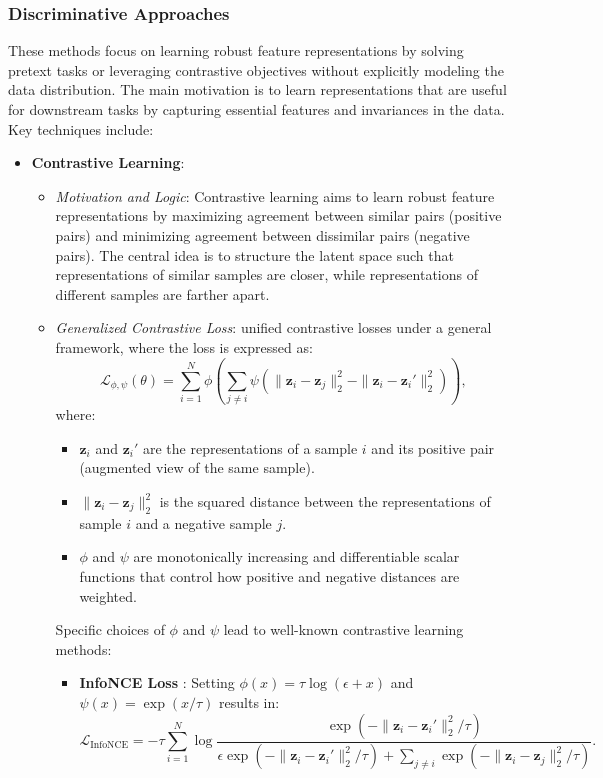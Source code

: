 \subsubsection{Discriminative Approaches}

These methods focus on learning robust feature representations by solving pretext tasks or leveraging contrastive objectives without explicitly modeling the data distribution. The main motivation is to learn representations that are useful for downstream tasks by capturing essential features and invariances in the data. Key techniques include:

\begin{itemize}
    \item \textbf{Contrastive Learning}:
    \begin{itemize}
        \item \emph{Motivation and Logic}: Contrastive learning aims to learn robust feature representations by maximizing agreement between similar pairs (positive pairs) and minimizing agreement between dissimilar pairs (negative pairs). The central idea is to structure the latent space such that representations of similar samples are closer, while representations of different samples are farther apart.

        \item \emph{Generalized Contrastive Loss}: \cite{tian2022} unified contrastive losses under a general framework, where the loss is expressed as:
        \[
        \mathcal{L}_{\phi,\psi}(\theta) = \sum_{i=1}^{N} \phi \left( \sum_{j \neq i} \psi\left(\|\mathbf{z}_i - \mathbf{z}_j\|_2^2 - \|\mathbf{z}_i - \mathbf{z}_i'\|_2^2\right) \right),
        \]
        where:
        \begin{itemize}
            \item \(\mathbf{z}_i\) and \(\mathbf{z}_i'\) are the representations of a sample \(i\) and its positive pair (augmented view of the same sample).
            \item \(\|\mathbf{z}_i - \mathbf{z}_j\|_2^2\) is the squared distance between the representations of sample \(i\) and a negative sample \(j\).
            \item \(\phi\) and \(\psi\) are monotonically increasing and differentiable scalar functions that control how positive and negative distances are weighted.
        \end{itemize}


        Specific choices of \(\phi\) and \(\psi\) lead to well-known contrastive learning methods:
        \begin{itemize}
            \item \textbf{InfoNCE Loss} \citep{oord2018representation}: Setting \(\phi(x) = \tau \log(\epsilon + x)\) and \(\psi(x) = \exp(x / \tau)\) results in:
            \[
            \mathcal{L}_{\text{InfoNCE}} = -\tau \sum_{i=1}^{N} \log \frac{\exp\left(-\|\mathbf{z}_i - \mathbf{z}_i'\|_2^2 / \tau\right)}{\epsilon \exp\left(-\|\mathbf{z}_i - \mathbf{z}_i'\|_2^2 / \tau\right) + \sum_{j \neq i} \exp\left(-\|\mathbf{z}_i - \mathbf{z}_j\|_2^2 / \tau\right)}.
            \]
        

\end{itemize}
\end{itemize}
\end{itemize}

